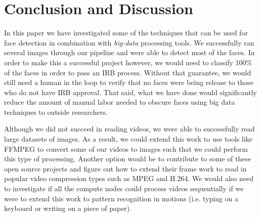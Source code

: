 \documentclass[
	submission,
	final,
	notitlepage,
	narroweqnarray,
	inline,
	twoside,
	]{ieee}
\begin{document}
\section{Conclusion and Discussion}
\PARstart In this paper we have investigated some of the techniques that can be used for face detection
in combination with \textit{big-data} processing tools. We successfully ran several images through
our pipeline and were able to detect most of the faces. In order to make this a successful project however, 
we would need to classify 100\% of the faces in order to pass an IRB process. Without that guarantee, 
we would still need a human in the loop to verify that no faces were being release to those who do
not have IRB approval. That said, what we have done would significantly reduce the amount of manual
labor needed to obscure faces using big data techniques to outside researchers. 

Although we did not succeed in reading videos, 
we were able to successfully read large datasets of images. As a result, we could extend this work 
to use tools like FFMPEG to convert some of our videos to images such that we could perform this
type of processing. Another option would be to contribute to some of these open source projects
and figure out how to extend their frame work to read in popular video compression types such as 
MPEG and H.264. We would also need to investigate if all the compute nodes could process videos sequentially
if we were to extend this work to pattern recognition in motions (i.e. typing on a keyboard or writing
on a piece of paper). 




\end{document}
